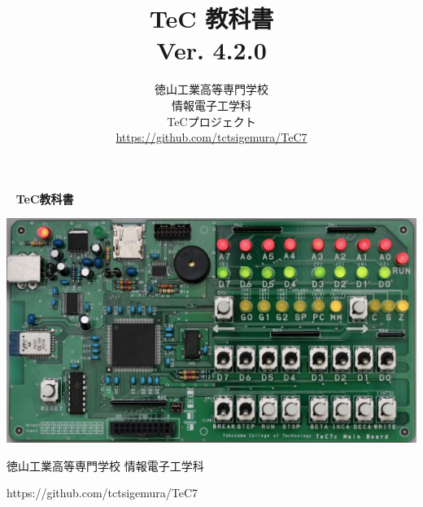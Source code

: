 \documentclass[a4paper,twocolumn,twoside]{ltjsbook}   %
\newif\ifPDF
\newcommand{\ver}{Ver. 4.2.0}
\begin{document}
\setcounter{page}{0}
\thispagestyle{empty}
\onecolumn
~
\vfill
\vfill
{\noindent
\fontsize{34pt}{50pt}\selectfont\textbf{TeC教科書}
}
\vfill
\vfill
\centerline{
  \includegraphics[scale=0.38]{Img/TeC7c.jpg}
}
\vfill
\vfill
\centerline{\Large 徳山工業高等専門学校 情報電子工学科}
\centerline{\Large\ttfamily https://github.com/tctsigemura/TeC7}
\vfill

\ifPDF
\newpage
\setcounter{page}{0}
\thispagestyle{empty}
\onecolumn
~
\fi

\frontmatter
\title{TeC 教科書\\\ver}
\author{徳山工業高等専門学校\\情報電子工学科\\TeCプロジェクト\\
\url{https://github.com/tctsigemura/TeC7}}
\date{}
\maketitle
\end{document}
